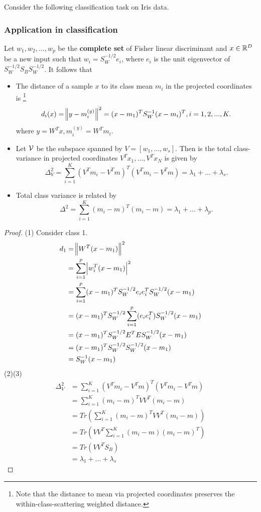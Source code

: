 \begin{refsection}
\begin{example}
	Consider the following classification task on Iris data. 
	
	
\end{example}

\subsubsection{Application in classification}
\begin{lemma}
	Let $w_1,w_2,...,w_p$ be the \textbf{complete set} of Fisher linear discriminant and $x\in\mathbb{R}^D$ be a new input such that $w_i = S_W^{-1/2}e_i$, where $e_i$ is the unit eigenvector of $S_W^{-1/2}S_BS_W^{-1/2}$.	It follows that
	\begin{itemize}
		\item The distance of a sample $x$ to its class mean $m_i$ in the projected coordinates is \footnote{Note that the distance to mean via projected coordinates preserves the within-class-scattering weighted distance.} 
		$$d_i(x) =  \norm{y - m_i^{(y)}}^2 = (x-m_1)^TS_W^{-1}(x-m_i)^T, i=1,2,...,K.$$
		where $y = W^Tx, m_i^{(y)} = W^Tm_i.$
		\item Let $\mathcal{V}$ be the subspace spanned by $V = [w_1,...,w_s]$. Then is the total class-variance in projected coordinates $V^Tx_1,...,V^Tx_N$ is given by
		$$\Delta^2_V = \sum_{i=1}^K (V^Tm_i - V^Tm)^T(V^Tm_i - V^Tm) = \lambda_1 + ... + \lambda_s.$$
		\item Total class variance is related by  
		$$\Delta^2 = \sum_{i=1}^K (m_i - m)^T(m_i - m) = \lambda_1 + ... + \lambda_p.$$
	\end{itemize}	
\end{lemma}
\begin{proof}
	(1) 
	Consider class 1. 
	\begin{align*}
	d_1 &= \norm{W^T(x - m_1)}^2 \\
	&= \sum_{i=1}^p \abs{w_i^T(x-m_1)}^2 \\
	&= \sum_{i=1}^p(x-m_1)^TS_W^{-1/2}e_ie_i^TS_W^{-1/2}(x-m_1) \\
	&= (x-m_1)^TS_W^{-1/2}\sum_{i=1}^p(e_ie_i^T)S_W^{-1/2}(x-m_1) \\
	&= (x-m_1)^TS_W^{-1/2}E^TES_W^{-1/2}(x-m_1) \\
	&= (x-m_1)^TS_W^{-1/2}S_W^{-1/2}(x-m_1) \\
	&= S_W^{-1}(x-m_1) 
	\end{align*}
	(2)(3)	
	\begin{align*}
	\Delta^2_V &= \sum_{i=1}^K (V^Tm_i - V^Tm)^T(V^Tm_i - V^Tm) \\
	&= \sum_{i=1}^K (m_i - m)^TVV^T(m_i - m) \\
	&= Tr(\sum_{i=1}^K (m_i - m)^TVV^T(m_i - m)) \\
	&= Tr(VV^T\sum_{i=1}^K (m_i - m)(m_i - m)^T) \\
	&= Tr(VV^TS_B) \\
	&= \lambda_1 + ... + \lambda_s
	\end{align*}
	

\end{proof}
\end{refsection}
